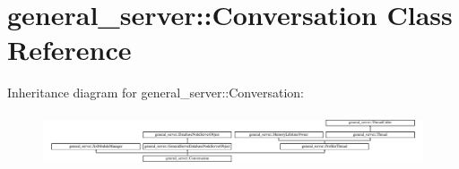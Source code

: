 \hypertarget{classgeneral__server_1_1Conversation}{\section{general\-\_\-server\-:\-:\-Conversation \-Class \-Reference}
\label{classgeneral__server_1_1Conversation}
}
\-Inheritance diagram for general\-\_\-server\-:\-:\-Conversation\-:\begin{figure}[H]
\begin{center}
\leavevmode
\includegraphics[height=1.573034cm]{classgeneral__server_1_1Conversation}
\end{center}
\end{figure}
